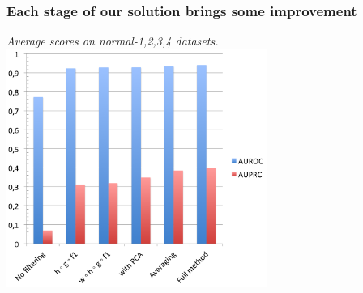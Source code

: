 \documentclass[final]{beamer}
\begin{document}
\begin{frame}
\frametitle{Each stage of our solution brings some improvement}


\begin{center}
\textit{Average scores on normal-{1,2,3,4} datasets.
}
\includegraphics[width=8.5cm]{images/data_stage.png}
\end{center}




\end{frame}
\end{document}
